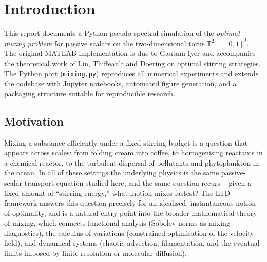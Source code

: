 \documentclass[12pt,a4paper]{article}
\theoremstyle{definition}
\theoremstyle{plain}
\begin{document}
\tableofcontents
\bigskip

\section{Introduction}
\label{sec:intro}

This report documents a Python pseudo-spectral simulation of the
\emph{optimal mixing problem} for passive scalars on the two-dimensional
torus $\mathbb{T}^2 = [0,1]^2$.
The original MATLAB implementation is due to Gautam Iyer and accompanies the
theoretical work of Lin, Thiffeault and Doering \cite{LTD2011} on optimal
stirring strategies.
The Python port (\texttt{mixing.py}) reproduces all numerical experiments
and extends the codebase with Jupyter notebooks, automated figure generation,
and a packaging structure suitable for reproducible research.

\subsection{Motivation}

Mixing a substance efficiently under a fixed stirring budget is a question
that appears across scales: from folding cream into coffee, to homogenising
reactants in a chemical reactor, to the turbulent dispersal of pollutants
and phytoplankton in the ocean. In all of these settings the underlying
physics is the same passive-scalar transport equation studied here, and the
same question recurs -- given a fixed amount of ``stirring energy,'' what
motion mixes fastest? The LTD framework answers this question precisely for
an idealised, instantaneous notion of optimality, and is a natural entry
point into the broader mathematical theory of mixing, which connects
functional analysis (Sobolev norms as mixing diagnostics), the calculus of
variations (constrained optimisation of the velocity field), and dynamical
systems (chaotic advection, filamentation, and the eventual limits imposed
by finite resolution or molecular diffusion).
\end{document}
